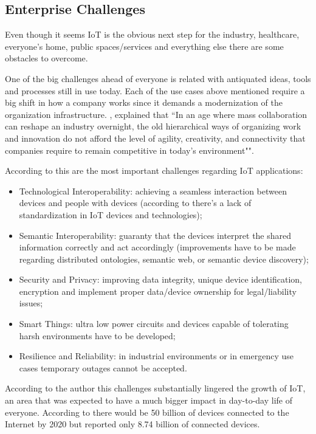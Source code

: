 \subsection{Enterprise Challenges}
\label{subsec:stateofart:iot:challenges}

Even though it seems \gls{IoT} is the obvious next step for the industry, healthcare, everyone's home, public spaces/services and everything else there are some obstacles to overcome.

One of the big challenges ahead of everyone is related with antiquated ideas, tools and processes still in use today.
Each of the use cases above mentioned require a big shift in how a company works since it demands a modernization of the organization infrastructure.
\cite{tapscott2006wikinomics}, explained that ``In an age where mass collaboration can reshape an industry overnight, the old hierarchical ways of organizing work and innovation do not afford the level of agility, creativity, and connectivity that companies require to remain competitive in today's environment"".

According to \cite{7073822} this are the most important challenges regarding \gls{IoT} applications:

\begin{itemize}
    \item Technological Interoperability: achieving a seamless interaction between devices and people with devices (according to \cite{al2016iot} there's a lack of standardization in \gls{IoT} devices and technologies);
    \item Semantic Interoperability: guaranty that the devices interpret the shared information
correctly and act accordingly (improvements have to be made regarding distributed ontologies, semantic web, or semantic device discovery);
    \item Security and Privacy: improving data integrity, unique device identification, encryption and implement proper data/device ownership for legal/liability issues;
    \item Smart Things: ultra low power circuits and devices capable of tolerating harsh environments have to be developed;
    \item Resilience and Reliability: in industrial environments or in emergency use cases temporary outages cannot be accepted.
\end{itemize}

According to the author this challenges substantially lingered the growth of \gls{IoT}, an area that was expected to have a much bigger impact in day-to-day life of everyone. According to \cite{iot-cisco-prediction} there would be 50 billion of devices connected to the Internet by 2020 but \cite{statista-number-devices} reported only 8.74 billion of connected devices.

